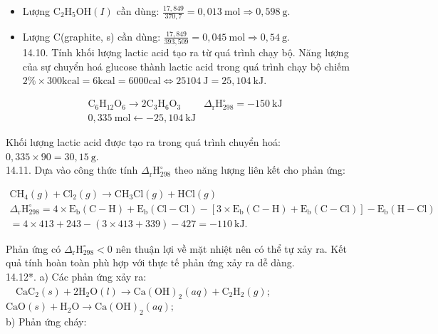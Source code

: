 \documentclass[10pt]{article}
\begin{document}
\begin{itemize}
  \item Lượng $\mathrm{C}_{2} \mathrm{H}_{5} \mathrm{OH}(I)$ cần dùng: $\frac{17,849}{370,7}=0,013 \mathrm{~mol} \Rightarrow 0,598 \mathrm{~g}$.
  \item Lượng C(graphite, s) cần dùng: $\frac{17,849}{393,509}=0,045 \mathrm{~mol} \Rightarrow 0,54 \mathrm{~g}$.\\
14.10. Tính khối lượng lactic acid tạo ra từ quá trình chạy bộ. Năng lượng của sự chuyển hoá glucose thành lactic acid trong quá trình chạy bộ chiếm $2 \% \times 300 \mathrm{kcal} =6 \mathrm{kcal}=6000 \mathrm{cal} \Leftrightarrow 25104 \mathrm{~J}=25,104 \mathrm{~kJ}$.
\end{itemize}

$$
\begin{array}{ll}
\mathrm{C}_{6} \mathrm{H}_{12} \mathrm{O}_{6} \rightarrow 2 \mathrm{C}_{3} \mathrm{H}_{6} \mathrm{O}_{3} & \Delta_{\mathrm{r}} \mathrm{H}_{298}^{\circ}=-150 \mathrm{~kJ} \\
0,335 \mathrm{~mol} \leftarrow-25,104 \mathrm{~kJ} &
\end{array}
$$

Khối lượng lactic acid được tạo ra trong quá trình chuyển hoá: $0,335 \times 90=30,15 \mathrm{~g}$.\\
14.11. Dựa vào công thức tính $\Delta_{\mathrm{r}} \mathrm{H}_{298}^{\circ}$ theo năng lượng liên kết cho phản ứng:

$$
\begin{gathered}
\mathrm{CH}_{4}(g)+\mathrm{Cl}_{2}(g) \rightarrow \mathrm{CH}_{3} \mathrm{Cl}(g)+\mathrm{HCl}(g) \\
\Delta_{\mathrm{r}} \mathrm{H}_{298}^{\circ}=4 \times \mathrm{E}_{\mathrm{b}}(\mathrm{C}-\mathrm{H})+\mathrm{E}_{\mathrm{b}}(\mathrm{Cl}-\mathrm{Cl})-\left[3 \times \mathrm{E}_{\mathrm{b}}(\mathrm{C}-\mathrm{H})+\mathrm{E}_{\mathrm{b}}(\mathrm{C}-\mathrm{Cl})\right]-\mathrm{E}_{\mathrm{b}}(\mathrm{H}-\mathrm{Cl}) \\
=4 \times 413+243-(3 \times 413+339)-427=-110 \mathrm{~kJ} .
\end{gathered}
$$

Phản ứng có $\Delta_{\mathrm{r}} \mathrm{H}_{298}^{\circ}<0$ nên thuận lợi về mặt nhiệt nên có thể tự xảy ra. Kết quả tính hoàn toàn phù hợp với thực tế phản ứng xảy ra dễ dàng.\\
14.12*. a) Các phản ứng xảy ra: $\quad \mathrm{CaC}_{2}(s)+2 \mathrm{H}_{2} \mathrm{O}(l) \rightarrow \mathrm{Ca}(\mathrm{OH})_{2}(a q)+\mathrm{C}_{2} \mathrm{H}_{2}(g)$; $\mathrm{CaO}(s)+\mathrm{H}_{2} \mathrm{O} \rightarrow \mathrm{Ca}(\mathrm{OH})_{2}(a q) ;$\\
b) Phản ứng cháy:
\end{document}
